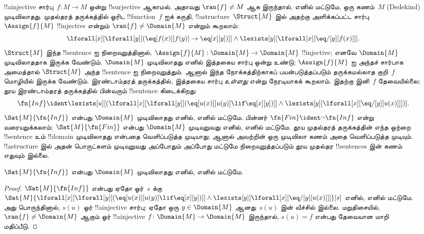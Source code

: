 \documentclass[../../../include/open-logic-section]{subfiles}
\begin{document}



!!a{injective} சார்பு~$f\colon M \to M$ ஒன்று !!{surjective} ஆகாமல்,
அதாவது $\ran{f} \neq M$ ஆக இருந்தால், எனில் மட்டுமே, ஒரு கணம்~$M$
(Dedekind) முடிவிலாதது. முதல்தரத் தருக்கத்தில் ஓரிட
!!{function}~$f$ ஐக் கருதி, !!a{structure}~$\Struct{M}$ இல் அதற்கு
அளிக்கப்பட்ட சார்பு~$\Assign{f}{M}$ !!{injective} என்றும்
$\ran{f} \neq \Domain{M}$ என்றும் கூறலாம்:
\[
\lforall[x][\lforall[y][(\eq[f(x)][f(y)] \to \eq[x][y])]] \land
\lexists[y][\lforall[x][\eq/[y][f(x)]]].
\]
$\Struct{M}$ இந்த !!{sentence} ஐ நிறைவுறுத்தினால்,
$\Assign{f}{M}: \Domain{M} \to \Domain{M}$ !!{injective}; எனவே
$\Domain{M}$ முடிவிலாததாக இருக்க வேண்டும். $\Domain{M}$ முடிவிலாதது
எனில் இத்தகைய சார்பு ஒன்று உண்டு; $\Assign{f}{M}$ ஐ அந்தச் சார்பாக
அமைத்தால் $\Struct{M}$ அந்த !!{sentence} ஐ நிறைவுறுத்தும். ஆனால்
இந்த நோக்கத்திற்காகப் பயன்படுத்தப்படும் தருக்கமல்லாத குறி~$f$ மொழியில்
இருக்க வேண்டும். இரண்டாம்தரத் தருக்கத்தில், இத்தகைய சார்பு
\emph{உள்ளது} என்று நேரடியாகக் கூறலாம். இதற்கு இனி~$f$ தேவையில்லை;
தூய இரண்டாம்தரத் தருக்கத்தில் பின்வரும் !!{sentence} கிடைக்கிறது:
\[
\fn{Inf} \ident \lexists[u][(\lforall[x][\lforall[y][(\eq[u(x)][u(y)]
      \lif \eq[x][y])]] \land \lexists[y][\lforall[x][\eq/[y][u(x)]]])].
\]
$\Sat{M}{\fn{Inf}}$ என்பது $\Domain{M}$ முடிவிலாதது எனில், எனில்
மட்டுமே. பின்னர் $\fn{Fin} \ident \lnot \fn{Inf}$ என்று
வரையறுக்கலாம்; $\Sat{M}{\fn{Fin}}$ என்பது $\Domain{M}$ முடிவுறுவது
எனில், எனில் மட்டுமே. தூய முதல்தரத் தருக்கத்தின் எந்த ஒற்றை
!!{sentence} உம் !!{domain} முடிவிலாதது என்பதை வெளிப்படுத்த முடியாது;
ஆனால் அவற்றின் ஒரு முடிவிலா கணம் அதை வெளிப்படுத்த முடியும்.
!!a{structure} இல் அதன் பொருட்களம் முடிவுறுவது அப்போதும் அப்போது
மட்டுமே நிறைவுறுத்தப்படும் தூய முதல்தர !!{sentence}s இன் கணம்
எதுவும் இல்லை.

\begin{prop}
$\Sat{M}{\fn{Inf}}$ என்பது $\Domain{M}$ முடிவிலாதது எனில், எனில் மட்டுமே.
\end{prop}

\begin{proof}
$\Sat{M}{\fn{Inf}}$ என்பது ஏதோ ஓர்~$s$ க்கு
  $\Sat{M}{\lforall[x][\lforall[y][(\eq[u(x)][u(y)] \lif \eq[x][y])]]
    \land \lexists[y][\lforall[x][\eq/[y][u(x)]]]}[s]$ எனில், எனில்
  மட்டுமே. அது பொருந்தினால், $s(u)$ ஓர் !!a{injective} சார்பு;
  ஏதோ ஒரு $y \in \Domain{M}$ ஆனது~$s(u)$ இன் வீச்சில் இல்லை.
  மறுதிசையில், $\ran{f} \neq \Domain{M}$ ஆகும் ஓர் !!a{injective}
  $f\colon \Domain{M} \to \Domain{M}$ இருந்தால், $s(u) = f$ என்பது
  தேவையான மாறி மதிப்பீடு.
\end{proof}
\end{document}
